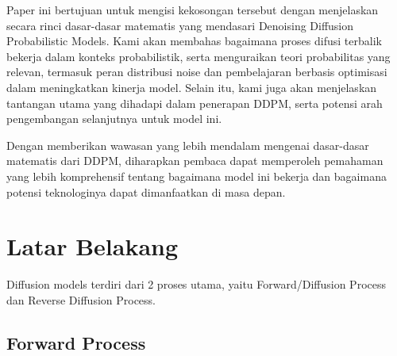 \documentclass{article}
\begin{document}
Paper ini bertujuan untuk mengisi kekosongan tersebut dengan menjelaskan secara rinci dasar-dasar matematis yang mendasari Denoising Diffusion Probabilistic Models. Kami akan membahas bagaimana proses difusi terbalik bekerja dalam konteks probabilistik, serta menguraikan teori probabilitas yang relevan, termasuk peran distribusi noise dan pembelajaran berbasis optimisasi dalam meningkatkan kinerja model. Selain itu, kami juga akan menjelaskan tantangan utama yang dihadapi dalam penerapan DDPM, serta potensi arah pengembangan selanjutnya untuk model ini.

Dengan memberikan wawasan yang lebih mendalam mengenai dasar-dasar matematis dari DDPM, diharapkan pembaca dapat memperoleh pemahaman yang lebih komprehensif tentang bagaimana model ini bekerja dan bagaimana potensi teknologinya dapat dimanfaatkan di masa depan.


\section{Latar Belakang}


Diffusion models terdiri dari 2 proses utama, yaitu Forward/Diffusion Process dan Reverse Diffusion Process.


\subsection{Forward Process}
\end{document}
